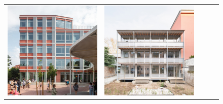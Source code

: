 \begin{figure}[H]
{\begin{tabular}{@{}ccccc@{}}
      \includegraphics[width=\linewidth]{Images/LoRAs/Modulariteit/Training_images/8.jpg} &
      \includegraphics[width=\linewidth]{Images/LoRAs/Modulariteit/Training_images/9.png} &

\end{tabular}}
\end{figure}
